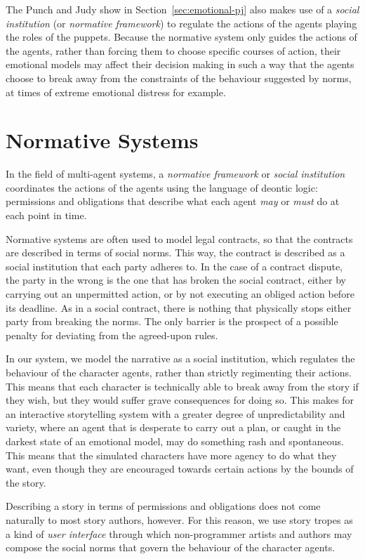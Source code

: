 \documentclass[11pt]{report}
\begin{document}
The Punch and Judy show in Section~\ref{sec:emotional-pj} also makes use of a
\emph{social institution} (or \emph{normative framework}) to regulate the
actions of the agents playing the roles of the puppets. Because the normative
system only guides the actions of the agents, rather than forcing them to choose
specific courses of action, their emotional models may affect their decision
making in such a way that the agents choose to break away from the constraints
of the behaviour suggested by norms, at times of extreme emotional distress for
example.

\section{Normative Systems}
\label{sec:normative-intro}
In the field of multi-agent systems, a \emph{normative framework} or
\emph{social institution} coordinates the actions of the agents using the
language of deontic logic: permissions and obligations that describe what each
agent \emph{may} or \emph{must} do at each point in time.

Normative systems are often used to model legal contracts, so that the contracts
are described in terms of social norms. This way, the contract is described as a
social institution that each party adheres to. In the case of a contract
dispute, the party in the wrong is the one that has broken the social contract,
either by carrying out an unpermitted action, or by not executing an obliged
action before its deadline. As in a social contract, there is nothing that
physically stops either party from breaking the norms. The only barrier is the
prospect of a possible penalty for deviating from the agreed-upon rules.

In our system, we model the narrative as a social institution, which regulates
the behaviour of the character agents, rather than strictly regimenting their
actions. This means that each character is technically able to break away from
the story if they wish, but they would suffer grave consequences for doing so.
This makes for an interactive storytelling system with a greater degree of
unpredictability and variety, where an agent that is desperate to carry out a
plan, or caught in the darkest state of an emotional model, may do something
rash and spontaneous. This means that the simulated characters have more agency
to do what they want, even though they are encouraged towards certain actions by
the bounds of the story.

Describing a story in terms of permissions and obligations does not come
naturally to most story authors, however. For this reason, we use story tropes
as a kind of \emph{user interface} through which non-programmer artists and
authors may compose the social norms that govern the behaviour of the character agents.
\end{document}
